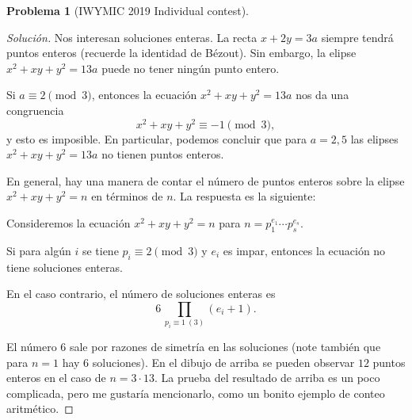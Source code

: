 \documentclass{article}
\theoremstyle{definition}
\newtheorem{problema}{Problema}
\newenvironment{solucion}{\begin{proof}[Solución]}{\end{proof}}
\begin{document}
\begin{problema}[IWYMIC 2019 Individual contest]
\begin{solucion}
    Nos interesan soluciones enteras. La recta $x + 2y = 3a$ siempre tendrá
    puntos enteros (recuerde la identidad de Bézout). Sin embargo, la elipse
    $x^2 + xy + y^2 = 13a$ puede no tener ningún punto entero.

    Si $a \equiv 2 \pmod{3}$, entonces la ecuación $x^2 + xy + y^2 = 13a$ nos da una congruencia
    $$x^2 + xy + y^2 \equiv -1 \pmod{3},$$
    y esto es imposible. En particular, podemos concluir que para $a = 2,5$ las
    elipses $x^2 + xy + y^2 = 13a$ no tienen puntos enteros.

    En general, hay una manera de contar el número de puntos enteros sobre la
    elipse $x^2 + xy + y^2 = n$ en términos de $n$. La respuesta es la
    siguiente:

    \begin{framed}
      \noindent Consideremos la ecuación $x^2 + xy + y^2 = n$ para
      $n = p_1^{e_1}\cdots p_s^{e_s}$.

      \noindent Si para algún $i$ se tiene $p_i \equiv 2 \pmod{3}$ y $e_i$ es
      impar, entonces la ecuación no tiene soluciones enteras.

      \noindent En el caso contrario, el número de soluciones enteras es
      $$6\,\prod_{p_i \equiv 1 ~ (3)} (e_i + 1).$$
    \end{framed}

    El número $6$ sale por razones de simetría en las soluciones (note también
    que para $n = 1$ hay $6$ soluciones). En el dibujo de arriba se pueden
    observar $12$ puntos enteros en el caso de $n = 3\cdot 13$.  La prueba del
    resultado de arriba es un poco complicada, pero me gustaría mencionarlo,
    como un bonito ejemplo de conteo aritmético.
  \end{solucion}\fi
\end{problema}
\end{document}
